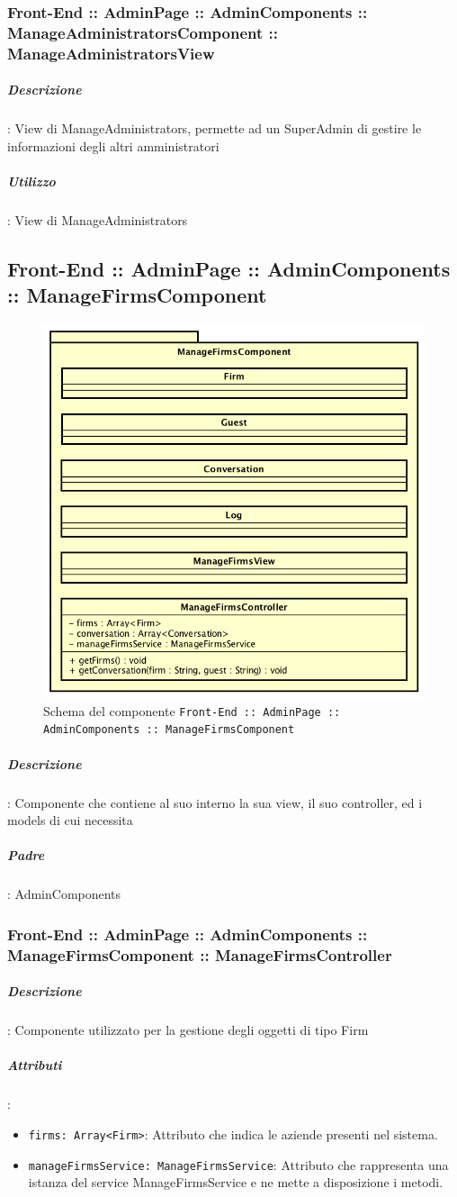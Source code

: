 \documentclass[../ManualeSviluppatore_v1.0.0.tex]{subfiles}
\begin{document}
				\subsubsection{Front-End :: AdminPage :: AdminComponents :: ManageAdministratorsComponent :: ManageAdministratorsView}
					\subparagraph{Descrizione}: View di ManageAdministrators, permette ad un SuperAdmin di gestire le informazioni degli altri amministratori
					\subparagraph{Utilizzo}: View di ManageAdministrators

	\newpage
	\subsection{Front-End :: AdminPage :: AdminComponents :: ManageFirmsComponent}
	\begin{figure}[!h]
		\centering
		\includegraphics[scale=0.6]{Architettura/Front-End/AdminPage/AdminComponents/ManageFirmsComponent.png}
		\caption{Schema del componente \texttt{Front-End :: AdminPage :: AdminComponents :: ManageFirmsComponent}}
	\end{figure}

			\subparagraph{Descrizione}: Componente che contiene al suo interno la sua view, il suo controller, ed i models di cui necessita
			\subparagraph{Padre}: AdminComponents
				\subsubsection{Front-End :: AdminPage :: AdminComponents :: ManageFirmsComponent :: ManageFirmsController}
					\subparagraph{Descrizione}: Componente utilizzato per la gestione degli oggetti di tipo Firm
					\subparagraph{Attributi}:
					\begin{itemize}
						\item \texttt{firms: Array<Firm>}: Attributo che indica le aziende presenti nel sistema.
						\item \texttt{manageFirmsService: ManageFirmsService}: Attributo che rappresenta una istanza del service ManageFirmsService e ne mette a disposizione i metodi.
					\end{itemize}
\end{document}

